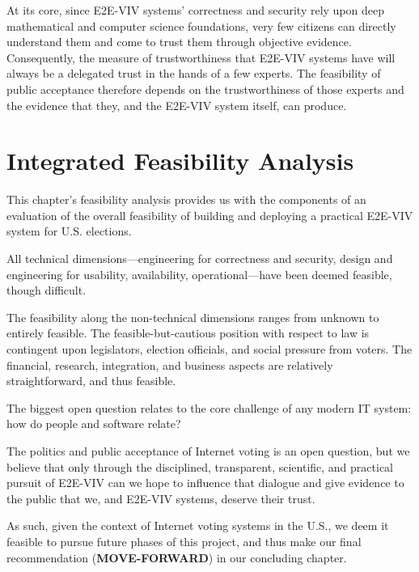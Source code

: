 At its core, since E2E-VIV systems' correctness and security rely upon
deep mathematical and computer science foundations, very few citizens
can directly understand them and come to trust them through objective
evidence. Consequently, the measure of trustworthiness that E2E-VIV
systems have will always be a delegated trust in the hands of a few
experts. The feasibility of public acceptance therefore depends on the
trustworthiness of those experts and the evidence that they, and the
E2E-VIV system itself, can produce.

\section{Integrated Feasibility Analysis}

This chapter's feasibility analysis provides us with the components of
an evaluation of the overall feasibility of building and deploying a
practical E2E-VIV system for U.S. elections.

All technical dimensions---engineering for correctness and security,
design and engineering for usability, availability, operational---have
been deemed feasible, though difficult.

The feasibility along the non-technical dimensions ranges from unknown
to entirely feasible.  The feasible-but-cautious position with respect
to law is contingent upon legislators, election officials, and social
pressure from voters.  The financial, research, integration, and
business aspects are relatively straightforward, and thus feasible.

The biggest open question relates to the core challenge of any modern
IT system: how do people and software relate?

The politics and public acceptance of Internet voting is an open
question, but we believe that only through the disciplined,
transparent, scientific, and practical pursuit of E2E-VIV can we hope
to influence that dialogue and give evidence to the public that we,
and E2E-VIV systems, deserve their trust.

As such, given the context of Internet voting systems in the U.S., we
deem it feasible to pursue future phases of this project, and thus
make our final recommendation (\textbf{MOVE-FORWARD}) in our
concluding chapter.

